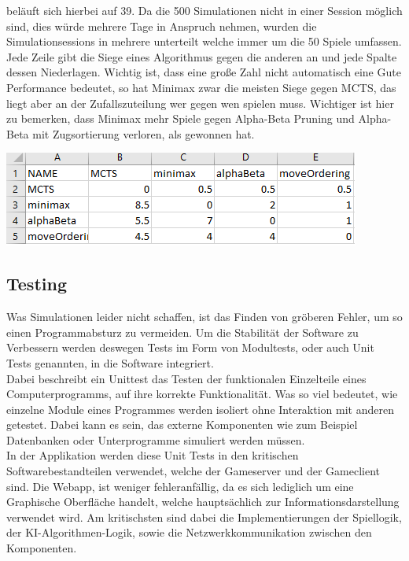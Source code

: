 \documentclass[12pt,a4paper,bibliography=totocnumbered,listof=totocnumbered]{article}
\begin{document}
beläuft sich hierbei auf 39. Da die 500 Simulationen nicht in einer Session möglich sind, dies würde mehrere Tage in Anspruch nehmen,
wurden die Simulationsessions  in mehrere unterteilt welche immer um die 50 Spiele umfassen.
Jede Zeile gibt die Siege eines Algorithmus gegen die anderen an und jede Spalte dessen Niederlagen.
Wichtig ist, dass eine große Zahl nicht automatisch eine Gute Performance bedeutet, so hat Minimax zwar die meisten
Siege gegen MCTS, das liegt aber an der Zufallszuteilung wer gegen wen spielen muss. Wichtiger ist hier zu bemerken, dass Minimax mehr Spiele 
gegen Alpha-Beta Pruning und Alpha-Beta mit Zugsortierung verloren, als gewonnen hat.


\vspace{1em}
\begin{minipage}{\linewidth}
	\centering
	\includegraphics[width=0.7\linewidth]{pics/ExcelSimulation.png}
	\label{fig:ExcelSimulation}
\end{minipage}


\subsection{Testing}
Was Simulationen leider nicht schaffen, ist das Finden von gröberen Fehler, um so einen Programmabsturz zu vermeiden.
Um die Stabilität der Software zu Verbessern werden deswegen Tests im Form von Modultests, oder auch Unit Tests genannten, in die Software integriert.
\\
Dabei beschreibt ein Unittest das Testen der funktionalen Einzelteile eines Computerprogramms, auf ihre korrekte Funktionalität. 
Was so viel bedeutet, wie einzelne Module eines Programmes werden isoliert ohne Interaktion mit anderen getestet. 
Dabei kann es sein, das externe Komponenten wie zum Beispiel Datenbanken oder Unterprogramme simuliert werden müssen. \cite{UnitTestBook}
\\
In der Applikation werden diese Unit Tests in den kritischen Softwarebestandteilen verwendet, welche der Gameserver und der Gameclient sind.
Die Webapp, ist weniger fehleranfällig, da es sich lediglich um eine Graphische Oberfläche handelt, welche hauptsächlich zur Informationsdarstellung verwendet wird.
Am kritischsten sind dabei die Implementierungen der Spiellogik, der KI-Algorithmen-Logik, sowie die Netzwerkkommunikation zwischen den Komponenten. 
\end{document}
